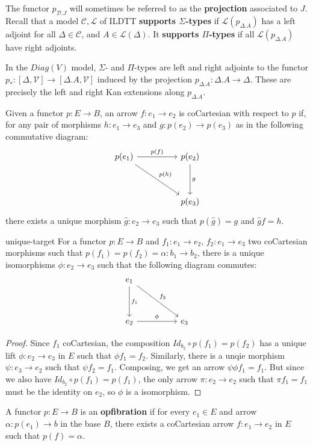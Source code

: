 The functor $p_{\mathcal{D}.J}$ will sometimes be referred to as the \textbf{projection} associated to $J$.
Recall that a model $\mathcal{C}, \mathcal{L}$ of ILDTT \textbf{supports $\Sigma$-types} if $\mathcal{L}(p_{\Delta.A})$ has a left adjoint for all $\Delta \in \mathcal{C}$, and $A \in \mathcal{L}(\Delta)$. It \textbf{supports $\Pi$-types} if all $\mathcal{L}(p_{\Delta.A})$ have right adjoints.
\begin{rem}
In the $Diag(V)$ model, $\Sigma$- and $\Pi$-types are left and right adjoints to the functor $p_* : [\Delta, \mathcal{V}] \to [\Delta.A, \mathcal{V}]$ induced by the projection $p_{\Delta.A} : \Delta.A \to \Delta$. These are precisely the left and right Kan extensions along $p_{\Delta.A}$.
\end{rem}
\begin{defn}
Given a functor $p : E \to B$, an arrow $f : e_1 \to e_2$ is coCartesian with respect to $p$ if, for any pair of morphisms $h : e_1 \to e_3$ and $g : p(e_2) \to p(e_3)$ as in the following commutative diagram:
\[
\ti
p(e_1) \ar[r, "p(f)"] \ar[rd, "p(h)"] & p(e_2) \ar[d, "g"] \\
& p(e_3)
\kz
\]
there exists a unique morphism $\hat g : e_2 \to e_3$ such that $p(\hat g) = g$ and $\hat g f = h$.
\end{defn}
\begin{lem}{unique-target}
For a functor $p : E \to B$ and $f_1 : e_1 \to e_2$, $f_2 : e_1 \to e_3$ two coCartesian morphisms such that $p(f_1) = p(f_2) = \alpha : b_1 \to b_2$, there is a unique isomorphisms $\phi : e_2 \to e_3$ such that the following diagram commutes:
\[
\ti
e_1 \ar[d, "f_1"] \ar[rd, "f_2"] & \\
e_2 \ar[r,"\phi"] &  e_3
\kz
\]
\begin{proof}
Since $f_1$ coCartesian, the composition $Id_{b_2} \circ p(f_1) = p(f_2)$ has a unique lift $\phi : e_2 \to e_3$ in $E$ such that $\phi f_1 = f_2$. Similarly, there is a unqie morphism $\psi : e_3 \to e_2$ such that $\psi f_2 = f_1$. Composing, we get an arrow $\psi \phi f_1 = f_1$. But since we also have $Id_{b_2} \circ p(f_1) = p(f_1)$, the only arrow $\pi : e_2 \to e_2$ such that $\pi f_1 = f_1$ must be the identity on $e_2$, so $\phi$ is a isomorphism.
\end{proof}
\end{lem}
\begin{defn}[Opfibration]
A functor $p : E \to B$ is an \textbf{opfibration} if for every $e_1 \in E$ and arrow $\alpha : p(e_1) \to b$ in the base $B$, there exists a coCartesian arrow $f : e_1 \to e_2$ in $E$ such that $p(f) = \alpha$.
\end{defn}
